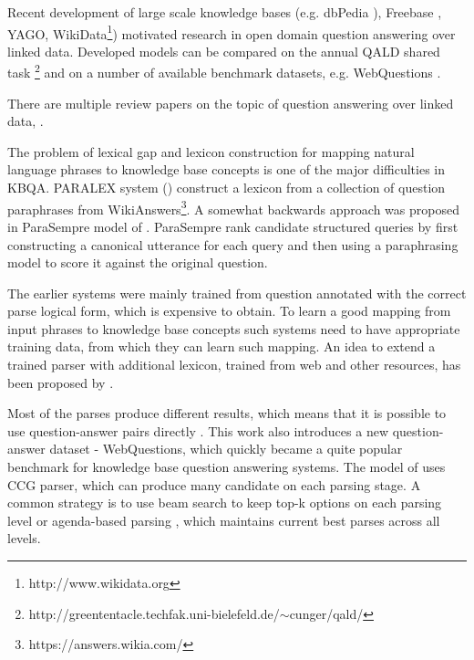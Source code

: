 Recent development of large scale knowledge bases (e.g. dbPedia \cite{auer2007dbpedia}), Freebase \cite{Bollacker:2008:FCC:1376616.1376746}, YAGO\cite{suchanek2007yago}, WikiData\footnote{http://www.wikidata.org}) motivated research in open domain question answering over linked data.
Developed models can be compared on the annual QALD shared task \footnote{http://greententacle.techfak.uni-bielefeld.de/$\sim$cunger/qald/} and on a number of available benchmark datasets, e.g. WebQuestions \cite{BerantCFL13:sempre}.


There are multiple review papers on the topic of question answering over linked data, \eg \cite{unger2014introduction}.


The problem of lexical gap and lexicon construction for mapping natural language phrases to knowledge base concepts is one of the major difficulties in KBQA.
PARALEX system (\cite{fader2013paraphrase}) construct a lexicon from a collection of question paraphrases from WikiAnswers\footnote{https://answers.wikia.com/}.
A somewhat backwards approach was proposed in ParaSempre model of \cite{BerantL14:parasempre}.
ParaSempre rank candidate structured queries by first constructing a canonical utterance for each query and then using a paraphrasing model to score it against the original question.

The earlier systems were mainly trained from question annotated with the correct parse logical form, which is expensive to obtain.
To learn a good mapping from input phrases to knowledge base concepts such systems need to have appropriate training data, from which they can learn such mapping.
An idea to extend a trained parser with additional lexicon, trained from web and other resources, has been proposed by \cite{CaiY13}.

Most of the parses produce different results, which means that it is possible to use question-answer pairs directly \cite{BerantCFL13:sempre}.
This work also introduces a new question-answer dataset - WebQuestions, which quickly became a quite popular benchmark for knowledge base question answering systems.
The model of \cite{BerantCFL13:sempre} uses CCG parser, which can produce many candidate on each parsing stage.
A common strategy is to use beam search to keep top-k options on each parsing level or agenda-based parsing \cite{berant2015imitation}, which maintains current best parses across all levels.

